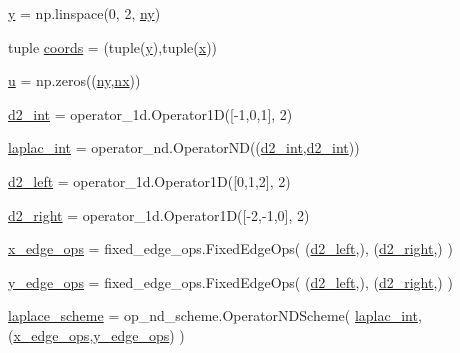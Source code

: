 \begin{DoxyCompactItemize}
\hyperlink{namespaceMain__PDE__Repo_1_1initializer_a0963e63e11418e26d8cc428b47669ff1}{y} = np.\+linspace(0, 2, \hyperlink{namespaceMain__PDE__Repo_1_1initializer_a705f203425c609ebc41db74879bf413a}{ny})
\item 
tuple \hyperlink{namespaceMain__PDE__Repo_1_1initializer_a3349742a76f7fa24317809e551e4b27a}{coords} = (tuple(\hyperlink{namespaceMain__PDE__Repo_1_1initializer_a0963e63e11418e26d8cc428b47669ff1}{y}),tuple(\hyperlink{namespaceMain__PDE__Repo_1_1initializer_a495f211daae2ee5ae3bbdb86436c35b5}{x}))
\item 
\hyperlink{namespaceMain__PDE__Repo_1_1initializer_af0ec17a2fbde89969e4c442f9f4fda75}{u} = np.\+zeros((\hyperlink{namespaceMain__PDE__Repo_1_1initializer_a705f203425c609ebc41db74879bf413a}{ny},\hyperlink{namespaceMain__PDE__Repo_1_1initializer_a7b9a1175cb86388f7315a7c6dee797e3}{nx}))
\item 
\hyperlink{namespaceMain__PDE__Repo_1_1initializer_a657e8b73e6463b4e45e67b4854e3bdcc}{d2\+\_\+int} = operator\+\_\+1d.\+Operator1D(\mbox{[}-\/1,0,1\mbox{]}, 2)
\item 
\hyperlink{namespaceMain__PDE__Repo_1_1initializer_a588f8a108166ccbf39c9e31dd69a1a7c}{laplac\+\_\+int} = operator\+\_\+nd.\+Operator\+ND((\hyperlink{namespaceMain__PDE__Repo_1_1initializer_a657e8b73e6463b4e45e67b4854e3bdcc}{d2\+\_\+int},\hyperlink{namespaceMain__PDE__Repo_1_1initializer_a657e8b73e6463b4e45e67b4854e3bdcc}{d2\+\_\+int}))
\item 
\hyperlink{namespaceMain__PDE__Repo_1_1initializer_a24c8c2b7c649edf215c2573852cd73fc}{d2\+\_\+left} = operator\+\_\+1d.\+Operator1D(\mbox{[}0,1,2\mbox{]}, 2)
\item 
\hyperlink{namespaceMain__PDE__Repo_1_1initializer_afd3adfb33fdba510d2b75e2cd9e01e42}{d2\+\_\+right} = operator\+\_\+1d.\+Operator1D(\mbox{[}-\/2,-\/1,0\mbox{]}, 2)
\item 
\hyperlink{namespaceMain__PDE__Repo_1_1initializer_a83990a2ef3c33e77b11cc09816b3388c}{x\+\_\+edge\+\_\+ops} = fixed\+\_\+edge\+\_\+ops.\+Fixed\+Edge\+Ops( (\hyperlink{namespaceMain__PDE__Repo_1_1initializer_a24c8c2b7c649edf215c2573852cd73fc}{d2\+\_\+left},), (\hyperlink{namespaceMain__PDE__Repo_1_1initializer_afd3adfb33fdba510d2b75e2cd9e01e42}{d2\+\_\+right},) )
\item 
\hyperlink{namespaceMain__PDE__Repo_1_1initializer_ae555cb401c7c00308a6d2917bf4459fb}{y\+\_\+edge\+\_\+ops} = fixed\+\_\+edge\+\_\+ops.\+Fixed\+Edge\+Ops( (\hyperlink{namespaceMain__PDE__Repo_1_1initializer_a24c8c2b7c649edf215c2573852cd73fc}{d2\+\_\+left},), (\hyperlink{namespaceMain__PDE__Repo_1_1initializer_afd3adfb33fdba510d2b75e2cd9e01e42}{d2\+\_\+right},) )
\item 
\hyperlink{namespaceMain__PDE__Repo_1_1initializer_a54a7ff0de91b35f3caa1d521b08d99a9}{laplace\+\_\+scheme} = op\+\_\+nd\+\_\+scheme.\+Operator\+N\+D\+Scheme( \hyperlink{namespaceMain__PDE__Repo_1_1initializer_a588f8a108166ccbf39c9e31dd69a1a7c}{laplac\+\_\+int}, (\hyperlink{namespaceMain__PDE__Repo_1_1initializer_a83990a2ef3c33e77b11cc09816b3388c}{x\+\_\+edge\+\_\+ops},\hyperlink{namespaceMain__PDE__Repo_1_1initializer_ae555cb401c7c00308a6d2917bf4459fb}{y\+\_\+edge\+\_\+ops}) )
\end{DoxyCompactItemize}


